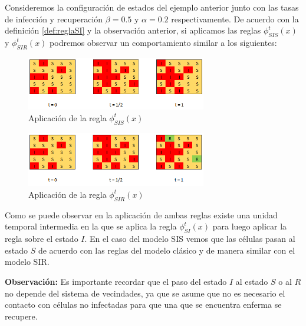 \begin{example}\label{ex:SISySIRenAutomatasCelulares}
Consideremos la configuración de estados del ejemplo anterior junto con las tasas de infección y recuperación $\beta=0.5$ y $\alpha=0.2$ respectivamente. De acuerdo con la definición \ref{def:reglaSI} y la observación anterior, si aplicamos las reglas $\phi_{SIS}^t(x)$ y $\phi_{SIR}^t(x)$ podremos observar un comportamiento similar a los siguientes:

\newpage

\begin{figure}[h]
  \centering
    \includegraphics[width=0.7\textwidth]{Imagenes/sisAplication.PNG}
    \caption{Aplicación de la regla $\phi_{SIS}^t(x)$}
\end{figure}

\begin{figure}[h]
  \centering
    \includegraphics[width=0.7\textwidth]{Imagenes/sirAplication.PNG}
    \caption{Aplicación de la regla $\phi_{SIR}^t(x)$}
\end{figure}

Como se puede observar en la aplicación de ambas reglas existe una unidad temporal intermedia en la que se aplica la regla $\phi_{SI}^t(x)$ para luego aplicar la regla sobre el estado $I$. En el caso del modelo SIS vemos que las células pasan al estado $S$ de acuerdo con las reglas del modelo clásico y de manera similar con el modelo SIR.
\end{example}

\textbf{Observación:} Es importante recordar que el paso del estado $I$ al estado $S$ o al $R$ no depende del sistema de vecindades, ya que se asume que no es necesario el contacto con células no infectadas para que una que se encuentra enferma se recupere.

